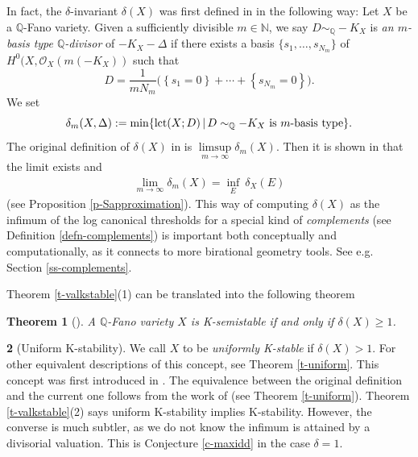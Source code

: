 \documentclass[12pt,reqno]{amsart}%
\newtheorem{thm}{Theorem}[section]
\theoremstyle{definition}
\newtheorem{say}[thm]{}
\theoremstyle{remark}
\newcommand{\cO}{{\mathcal{O}}}
\newcommand{\lct}{{\rm lct}}
\newcommand{\Q}{{\mathbb{Q}}}
\newcommand{\N}{{\mathbb{N}}}
\begin{document}
In fact, the $\delta$-invariant $\delta(X)$ was first defined in \cite{FO18} %
in the following way:
Let $X$ be a $\mathbb{Q}$-Fano variety. 
Given a sufficiently divisible $m \in \N$, we say $D \sim_{\Q} -K_X$ is \emph{an $m$-basis type $\Q$-divisor} of $-K_X-\Delta$ if there exists a basis 
$\{s_1,\ldots, s_{N_m}  \}$ of $H^0(X, \cO_{X}(m(-K_X))$ such that \[
D = \frac{1}{m N_m} \bigg(  \left\{ s_1=0 \right\} + \cdots + \left\{ s_{N_m}=0 \right\} \bigg) .\]
We set 
\[
\delta_{m}(X,\Delta): = \min \{ \lct(X;D) \, \vert \, D \sim_{\Q} -K_X \text{ is  $m$-basis type}\}.\]
The original definition of $\delta(X)$ in \cite{FO18} is  $\limsup\limits_{m \to \infty } \delta_{m} (X)$. 
Then it is shown in \cite[Theorem 4.4]{BJ20} that the limit exists and
\begin{eqnarray}\label{e-delta}
 \lim\limits_{m \to \infty } \delta_{m} (X)=\inf_E \ \delta_X(E)
\end{eqnarray}
(see Proposition \ref{p-Sapproximation}).
This way of computing $\delta(X)$ as the infimum of the log canonical thresholds for a special kind of \emph{complements} (see Definition \ref{defn-complements}) is important both conceptually and computationally, as it connects to more birational geometry tools.  See e.g.  Section \ref{ss-complements}.
\medskip

 Theorem \ref{t-valkstable}(1) can be translated into the following theorem
\begin{thm}[\cite{FO18, BJ20}]\label{t-delta}
A $\mathbb{Q}$-Fano variety $X$ is K-semistable if and only if $\delta(X)\ge 1$.
\end{thm}

\begin{say}[Uniform K-stability]\label{say-uniform}
We call $X$ to be {\it uniformly K-stable} if $\delta(X)>1$. For other equivalent descriptions of this concept, see Theorem \ref{t-uniform}. This concept was first introduced in \cite{BHJ17, Der16}. The equivalence between the original definition and the current one follows from the work of \cite{Fuj19b, BJ20} (see Theorem \ref{t-uniform}). Theorem \ref{t-valkstable}(2) says uniform K-stability implies K-stability. However, the converse is much subtler, as we do not know the infimum is attained by a divisorial valuation. This is Conjecture \ref{c-maxidd} in the case $\delta=1$.
\end{say}

\end{document}
